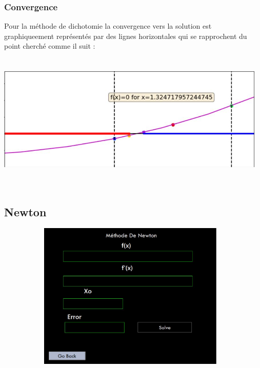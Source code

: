 \documentclass{article}
\begin{document}
\subsubsection{Convergence}
Pour la méthode de dichotomie la convergence vers la solution est graphiqueement représentés par des lignes horizontales qui se rapprochent du point cherché comme il suit : \\
\includegraphics[width=13cm,height=7cm]{img/dicho_cv.JPG}\\


\subsection{Newton}
\includegraphics[width=13cm,height=7cm]{img/newton.JPG}\\
\end{document}
